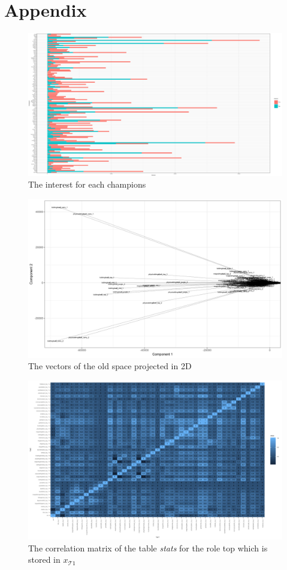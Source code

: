 \documentclass{article}
\begin{document}
\section{Appendix}
\begin{figure}
    \includegraphics[scale=0.35]{freq.png}
    \caption{The interest for each champions}
    \label{fig:freq}
\end{figure}

\begin{figure}
    \includegraphics[scale=0.45]{vectors.png}
    \caption{The vectors of the old space projected in 2D}
    \label{fig:vectors}
\end{figure}

\begin{figure}
    \includegraphics[scale=0.45]{cor2.png}
    \caption{The correlation matrix of the table \emph{stats} for the role top which is stored in $x_{\mathcal{T}1}$}
    \label{fig:cor2}
\end{figure}
\end{document}
